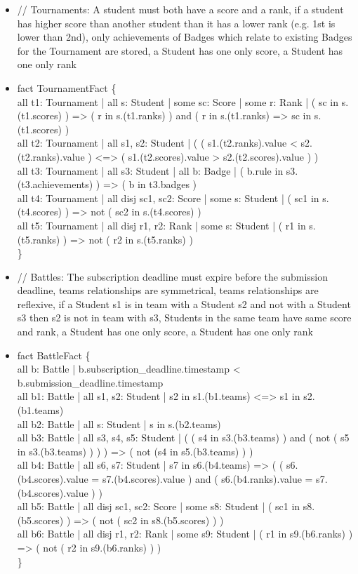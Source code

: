 \documentclass{Configuration_Files/Template}
\begin{document}
\begin{itemize}
\item // Tournaments: A student must both have a score and a rank, if a student has higher score than another student than it has a lower rank (e.g. 1st is lower than 2nd), only achievements of Badges which relate to existing Badges for the Tournament are stored, a Student has one only score, a Student has one only rank
\item fact TournamentFact \{\\
    all t1: Tournament | all s: Student | some sc: Score | some r: Rank | ( sc in s.(t1.scores) ) => ( r in s.(t1.ranks) ) and ( r in s.(t1.ranks) => sc in s.(t1.scores) )\\
    all t2: Tournament | all s1, s2: Student | ( ( s1.(t2.ranks).value < s2.(t2.ranks).value ) <=> ( s1.(t2.scores).value > s2.(t2.scores).value ) )\\
    all t3: Tournament | all s3: Student | all b: Badge | ( b.rule in s3.(t3.achievements) ) => ( b in t3.badges )\\
    all t4: Tournament | all disj sc1, sc2: Score | some s: Student | ( sc1 in s.(t4.scores) ) => not ( sc2 in s.(t4.scores) )\\
    all t5: Tournament | all disj r1, r2: Rank | some s: Student | ( r1 in s.(t5.ranks) ) => not ( r2 in s.(t5.ranks) )\\
\}\\

\item // Battles: The subscription deadline must expire before the submission deadline, teams relationships are symmetrical, teams relationships are reflexive, if a Student s1 is in team with a Student s2 and not with a Student s3 then s2 is not in team with s3, Students in the same team have same score and rank, a Student has one only score, a Student has one only rank
\item fact BattleFact \{\\
    all b: Battle | b.subscription\_deadline.timestamp < b.submission\_deadline.timestamp\\
    all b1: Battle | all s1, s2: Student | s2 in s1.(b1.teams) <=> s1 in s2.(b1.teams)\\
    all b2: Battle | all s: Student | s in s.(b2.teams)\\
    all b3: Battle | all s3, s4, s5: Student | ( ( s4 in s3.(b3.teams) )  and ( not ( s5 in s3.(b3.teams) ) ) ) => ( not (s4 in s5.(b3.teams) ) )\\
    all b4: Battle | all s6, s7: Student | s7 in s6.(b4.teams) => ( ( s6.(b4.scores).value = s7.(b4.scores).value ) and ( s6.(b4.ranks).value = s7.(b4.scores).value ) )\\
    all b5: Battle | all disj sc1, sc2: Score | some s8: Student | ( sc1 in s8.(b5.scores) ) => ( not ( sc2 in s8.(b5.scores) ) )\\
    all b6: Battle | all disj r1, r2: Rank | some s9: Student | ( r1 in s9.(b6.ranks) ) => ( not ( r2 in s9.(b6.ranks) ) )\\
\}\\


\end{itemize}
\end{document}
